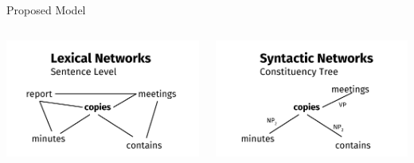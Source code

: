 \documentclass[10pt,=table]{beamer}
\begin{document}
\begin{frame}{Proposed Model}
	\begin{columns}
		\begin{minipage}[c][0.4\textheight][c]{\linewidth}
			 \centering
			 \includegraphics[width=1\linewidth]{image2/Chapitre2/lexi_network_ex.pdf}
		\end{minipage}
		\begin{minipage}[c][0.4\textheight][c]{\linewidth}
			 \centering
			 \includegraphics[width=1\linewidth]{image2/Chapitre2/consti_network_ex.pdf}
		\end{minipage}		
		\begin{minipage}[c][0.4\textheight][c]{\linewidth}

\end{minipage}
\end{columns}
\end{frame}
\end{document}
